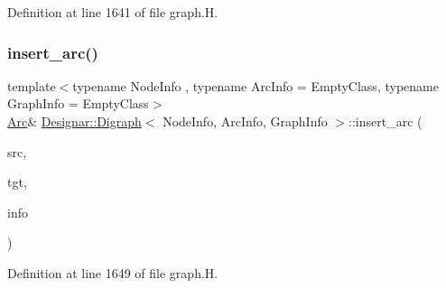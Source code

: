 Definition at line 1641 of file graph.\+H.

\mbox{\label{class_designar_1_1_digraph_a58d7f0e13a9e42cbc9e28683b527ca72}} 
\subsubsection{\texorpdfstring{insert\+\_\+arc()}{insert\_arc()}\hspace{0.1cm}{\footnotesize\ttfamily [3/4]}}
{\footnotesize\ttfamily template$<$typename Node\+Info , typename Arc\+Info  = Empty\+Class, typename Graph\+Info  = Empty\+Class$>$ \\
\hyperlink{class_designar_1_1_digraph_a0ceb278671f2a535c00fddccdeafd69f}{Arc}\& \hyperlink{class_designar_1_1_digraph}{Designar\+::\+Digraph}$<$ Node\+Info, Arc\+Info, Graph\+Info $>$\+::insert\+\_\+arc (\begin{DoxyParamCaption}\item[{\hyperlink{class_designar_1_1_digraph_a4dc921c41a480b7946a04170e997d8ae}{Node} \&}]{src,  }\item[{\hyperlink{class_designar_1_1_digraph_a4dc921c41a480b7946a04170e997d8ae}{Node} \&}]{tgt,  }\item[{const Arc\+Info \&}]{info }\end{DoxyParamCaption})\hspace{0.3cm}{\ttfamily [inline]}}



Definition at line 1649 of file graph.\+H.

\mbox{\label{class_designar_1_1_digraph_a9e46012a65696859c131d0bc5e096f55}} 
